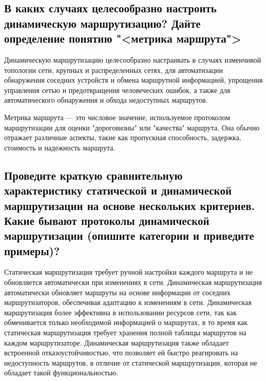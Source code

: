 \subsection{В каких случаях целесообразно настроить динамическую маршрутизацию?
Дайте определение понятию "<метрика маршрута">}

Динамическую маршрутизацию целесообразно настраивать
в случаях изменчивой топологии сети, крупных и распределенных сетях,
для автоматизации обнаружения соседних устройств
и обмена маршрутной информацией, упрощения управления сетью
и предотвращения человеческих ошибок,
а также для автоматического обнаружения и обхода недоступных маршрутов.\par
Метрика маршрута --- это числовое значение,
используемое протоколом маршрутизации для оценки "дороговизны"
или "качества" маршрута. Она обычно отражает различные аспекты,
такие как пропускная способность, задержка, стоимость и надежность маршрута.

\subsection{Проведите краткую сравнительную характеристику статической
и динамической маршрутизации на основе нескольких критериев.
Какие бывают протоколы динамической маршрутизации
    (опишите категории и приведите примеры)?}

Статическая маршрутизация требует ручной настройки каждого маршрута
и не обновляется автоматически при изменениях в сети.
Динамическая маршрутизация автоматически обновляет маршруты
на основе информации от соседних маршрутизаторов,
обеспечивая адаптацию к изменениям в сети.
Динамическая маршрутизация более эффективна в использовании ресурсов сети,
так как обменивается только необходимой информацией о маршрутах,
в то время как статическая маршрутизация требует хранения полной таблицы
маршрутов на каждом маршрутизаторе. Динамическая маршрутизация также обладает
встроенной отказоустойчивостью,
что позволяет ей быстро реагировать на недоступность маршрутов,
в отличие от статической маршрутизации,
которая не обладает такой функциональностью.

